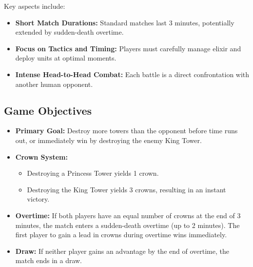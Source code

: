 \documentclass{article}
\begin{document}
Key aspects include:
\begin{itemize}
    \item \textbf{Short Match Durations:} Standard matches last 3 minutes, potentially extended by sudden-death overtime.
    \item \textbf{Focus on Tactics and Timing:} Players must carefully manage elixir and deploy units at optimal moments.
    \item \textbf{Intense Head-to-Head Combat:} Each battle is a direct confrontation with another human opponent.
\end{itemize}

\subsection{Game Objectives}
\begin{itemize}
    \item \textbf{Primary Goal:} Destroy more towers than the opponent before time runs out, or immediately win by destroying the enemy King Tower.
    \item \textbf{Crown System:}
    \begin{itemize}
        \item Destroying a Princess Tower yields 1 crown.
        \item Destroying the King Tower yields 3 crowns, resulting in an instant victory.
    \end{itemize}
    \item \textbf{Overtime:} If both players have an equal number of crowns at the end of 3 minutes, the match enters a sudden-death overtime (up to 2 minutes). The first player to gain a lead in crowns during overtime wins immediately.
    \item \textbf{Draw:} If neither player gains an advantage by the end of overtime, the match ends in a draw.
\end{itemize}
\end{document}
